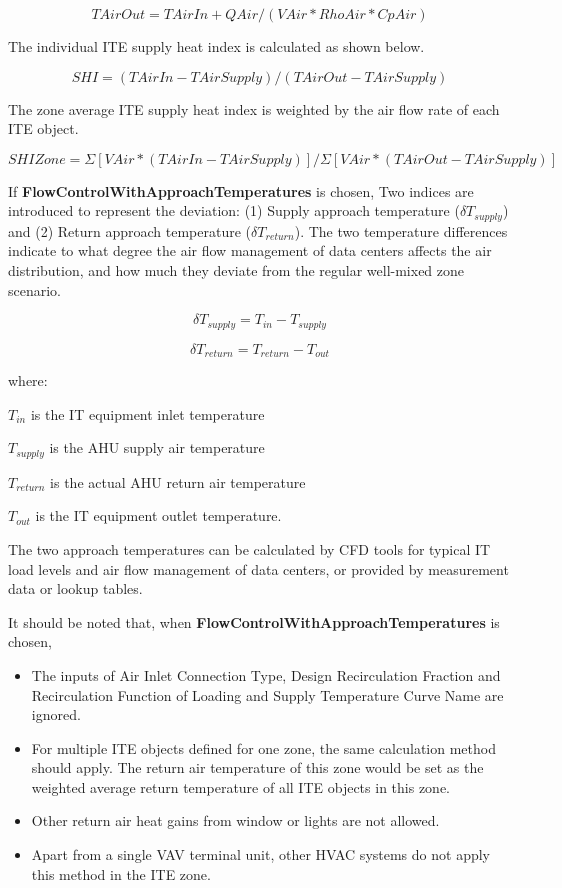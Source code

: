 \begin{equation}
TAirOut = TAirIn + QAir / (VAir * RhoAir * CpAir)
\end{equation}

The individual ITE supply heat index is calculated as shown below.

\begin{equation}
SHI = (TAirIn - TAirSupply) / (TAirOut - TAirSupply)
\end{equation}

The zone average ITE supply heat index is weighted by the air flow rate of each ITE object.

\begin{equation}
SHIZone = \Sigma [VAir * (TAirIn - TAirSupply)] / \Sigma [VAir * (TAirOut - TAirSupply)]
\end{equation}

If \textbf{FlowControlWithApproachTemperatures} is chosen, Two indices are introduced to represent the deviation: (1) Supply approach temperature ($\delta T_{supply}$) and (2) Return approach temperature ($\delta T_{return}$). The two temperature differences indicate to what degree the air flow management of data centers affects the air distribution, and how much they deviate from the regular well-mixed zone scenario.

\begin{equation}
\delta T_{supply}=T_{in}-T_{supply}
\end{equation}

\begin{equation}
\delta T_{return}=T_{return}-T_{out}
\end{equation}

where:

$T_{in}$ is the IT equipment inlet temperature

$T_{supply}$ is the AHU supply air temperature

$T_{return}$ is the actual AHU return air temperature

$T_{out}$ is the IT equipment outlet temperature.

The two approach temperatures can be calculated by CFD tools for typical IT load levels and air flow management of data centers, or provided by measurement data or lookup tables. 

It should be noted that, when \textbf{FlowControlWithApproachTemperatures} is chosen, 

\begin{itemize}
\item The inputs of Air Inlet Connection Type, Design Recirculation Fraction and Recirculation Function of Loading and Supply Temperature Curve Name are ignored.
\item For multiple ITE objects defined for one zone, the same calculation method should apply. The return air temperature of this zone would be set as the weighted average return temperature of all ITE objects in this zone.
\item Other return air heat gains from window or lights are not allowed.
\item Apart from a single VAV terminal unit, other HVAC systems do not apply this method in the ITE zone.
\end{itemize}

